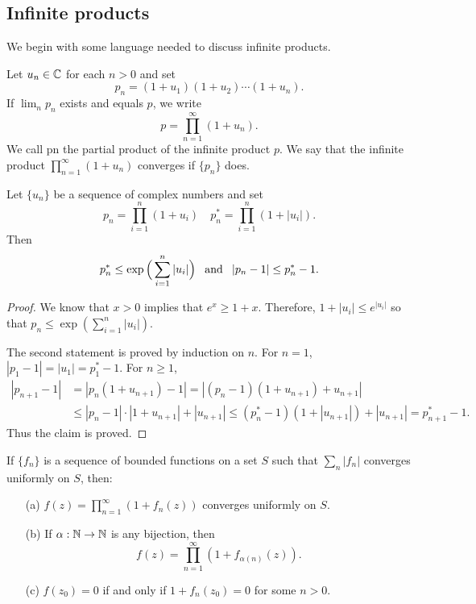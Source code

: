 \subsection{Infinite products}
We begin with some language needed to discuss infinite products.
\begin{definition}
Let $u_n\in\mathbb{C}$ for each $n>0$ and set
\[p_n=(1+u_1)(1+u_2)\cdots(1+u_n).\]
If $\lim_np_n$ exists and equals $p$, we write
\[p=\prod_{n=1}^{\infty}(1+u_n).\]
We call pn the partial product of the infinite product $p$. We say that the infinite product $\prod_{n=1}^{\infty}(1+u_n)$ converges if $\{p_n\}$ does.
\end{definition}
\begin{lemma}\label{infinite product lemma}
Let $\{u_n\}$ be a sequence of complex numbers and set
\[p_n=\prod_{i=1}^{n}(1+u_i)\quad p_n^*=\prod_{i=1}^{n}(1+|u_i|).\]
Then
\[p_n^*\leq\exp\Big(\sum_{i=1}^{n}|u_i|\Big)\hspace{8pt}\text{and}\hspace{8pt}|p_n-1|\leq p_n^*-1.\]
\end{lemma}
\begin{proof}
We know that $x>0$ implies that $e^x\geq 1+x$. Therefore, $1+|u_i|\leq e^{|u_i|}$ so that $p_n\leq\exp(\sum_{i=1}^{n}|u_i|)$.\par
The second statement is proved by induction on $n$. For $n=1$, $|p_1-1|=|u_1|=p_1^*-1$. For $n\geq 1$,
\begin{align*}
|p_{n+1}-1|&=|p_n(1+u_{n+1})-1|=|(p_n-1)(1+u_{n+1})+u_{n+1}|\\
&\leq|p_n-1|\cdot|1+u_{n+1}|+|u_{n+1}|\leq(p_n^*-1)(1+|u_{n+1}|)+|u_{n+1}|=p_{n+1}^*-1.
\end{align*}
Thus the claim is proved.
\end{proof}
\begin{theorem}\label{infinite product uniformly convergence}
If $\{f_n\}$ is a sequence of bounded functions on a set $S$ such that $\sum_{n}|f_n|$ converges uniformly on $S$, then:
\begin{itemize}
\item[(a)] $f(z)=\prod_{n=1}^{\infty}(1+f_n(z))$ converges uniformly on $S$.
\item[(b)] If $\alpha:\mathbb{N}\to\mathbb{N}$ is any bijection, then
\[f(z)=\prod_{n=1}^{\infty}(1+f_{\alpha(n)}(z)).\]
\item[(c)] $f(z_0)=0$ if and only if $1+f_n(z_0)=0$ for some $n>0$.
\end{itemize}
\end{theorem}
